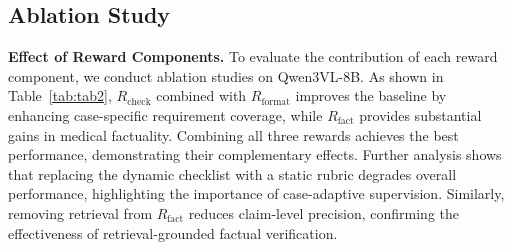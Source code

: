 \documentclass[letterpaper]{article} %
\begin{document}
\subsection{Ablation Study}
\noindent \textbf{Effect of Reward Components.} 
To evaluate the contribution of each reward component, we conduct ablation studies on Qwen3VL-8B. 
As shown in Table~\ref{tab:tab2}, $R_\text{check}$ combined with $R_\text{format}$ improves the baseline by enhancing case-specific requirement coverage, while $R_\text{fact}$ provides substantial gains in medical factuality. 
Combining all three rewards achieves the best performance, demonstrating their complementary effects. 
Further analysis shows that replacing the dynamic checklist with a static rubric degrades overall performance, highlighting the importance of case-adaptive supervision. 
Similarly, removing retrieval from $R_\text{fact}$ reduces claim-level precision, confirming the effectiveness of retrieval-grounded factual verification.

\end{document}
